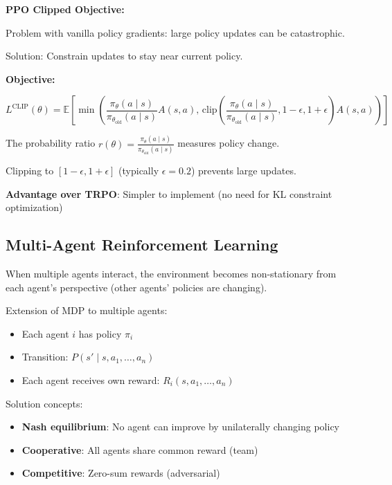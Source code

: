 \begin{seanbox}{5.10}
\textbf{PPO Clipped Objective:}

Problem with vanilla policy gradients: large policy updates can be catastrophic.

Solution: Constrain updates to stay near current policy.

\textbf{Objective:}

\begin{equation}
    L^{\text{CLIP}}(\theta) = \mathbb{E} \left[ \min \left( \frac{\pi_\theta(a \mid s)}{\pi_{\theta_{\text{old}}}(a \mid s)} A(s, a), \, \text{clip}\left(\frac{\pi_\theta(a \mid s)}{\pi_{\theta_{\text{old}}}(a \mid s)}, 1-\epsilon, 1+\epsilon\right) A(s, a) \right) \right]
\end{equation}

The probability ratio $r(\theta) = \frac{\pi_\theta(a \mid s)}{\pi_{\theta_{\text{old}}}(a \mid s)}$ measures policy change.

Clipping to $[1-\epsilon, 1+\epsilon]$ (typically $\epsilon = 0.2$) prevents large updates.

\textbf{Advantage over TRPO}: Simpler to implement (no need for KL constraint optimization)
\end{seanbox}

\subsection{Multi-Agent Reinforcement Learning}

When multiple agents interact, the environment becomes non-stationary from each agent's perspective (other agents' policies are changing).

\begin{definition}
Extension of MDP to multiple agents:

\begin{itemize}
    \item Each agent $i$ has policy $\pi_i$
    \item Transition: $P(s' \mid s, a_1, \ldots, a_n)$
    \item Each agent receives own reward: $R_i(s, a_1, \ldots, a_n)$
\end{itemize}

Solution concepts:
\begin{itemize}
    \item \textbf{Nash equilibrium}: No agent can improve by unilaterally changing policy
    \item \textbf{Cooperative}: All agents share common reward (team)
    \item \textbf{Competitive}: Zero-sum rewards (adversarial)
\end{itemize}
\end{definition}

